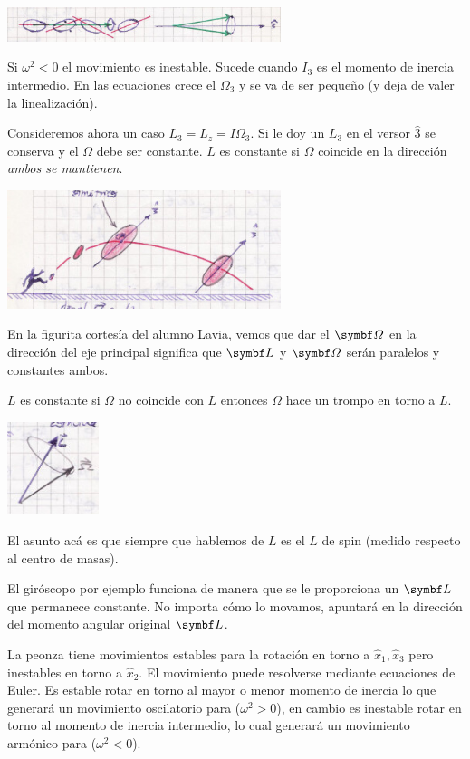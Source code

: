 \documentclass[10pt,oneside]{CBFT_book}
\begin{document}
\includegraphics[width=0.6\textwidth]{images/fig_mc_steiner_8.jpg}

Si $\omega^2 < 0 $ el movimiento es inestable. Sucede cuando $I_3$ es el momento de inercia intermedio. En las ecuaciones crece el
$\Omega_3$ y se va de ser pequeño (y deja de valer la linealización).

Consideremos ahora un caso $ L_3 = L_z = I \Omega_3 $. Si le doy un $ L_3 $ en el versor $ \hat{3} $ se conserva y el $\Omega$ debe 
ser constante. $L$ es constante si $\Omega$ coincide en la dirección {\it ambos se mantienen}.

\includegraphics[width=0.6\textwidth]{images/fig_mc_steiner_9.jpg}

En la figurita cortesía del alumno Lavia, vemos que dar el $\vb{\Omega}$ en la dirección del eje principal significa que $\vb{L}$
y $\vb{\Omega}$ serán paralelos y constantes ambos.

$L$ es constante si $\Omega$ no coincide con $L$ entonces $\Omega$ hace un trompo en torno a $L$.

\includegraphics[width=0.2\textwidth]{images/fig_mc_steiner_10.jpg}

El asunto acá es que siempre que hablemos de $L$ es el $L$ de spin (medido respecto al centro de masas).

El giróscopo por ejemplo funciona de manera que se le proporciona un $\vb{L}$ que permanece constante. No importa cómo lo movamos,
apuntará en la dirección del momento angular original $\vb{L}$.

La peonza tiene movimientos estables para la rotación en torno a $\hat{x}_1, \hat{x}_3$ pero inestables en
torno a $\hat{x}_2$. El movimiento puede resolverse mediante ecuaciones de Euler.
Es estable rotar en torno al mayor o menor momento de inercia lo que generará un movimiento oscilatorio
para \vb{\Omega} ($\omega^2 > 0$), en cambio es inestable rotar en torno al momento de inercia intermedio, lo cual generará
un movimiento armónico para \vb{\Omega} ($\omega^2 < 0$).
\end{document}
